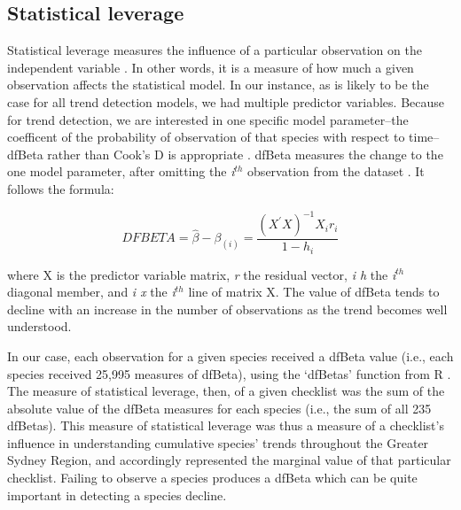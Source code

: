\documentclass[9pt,twocolumn,twoside,lineno]{pnas-new}
\begin{document}
{\subsection*{Statistical leverage} Statistical leverage measures the influence of a particular observation on the independent variable \cite{cook1977detection}. In other words, it is a measure of how much a given observation affects the statistical model. In our instance, as is likely to be the case for all trend detection models, we had multiple predictor variables.  Because for trend detection, we are interested in one specific model parameter--the coefficent of the probability of observation of that species with respect to time--dfBeta rather than Cook's D is appropriate \citep{bollinger1981book}. dfBeta measures the change to the one model parameter, after omitting the \textit{i$^{th}$} observation from the dataset \cite{belsley1980regression, bollinger1981book}. It follows the formula:

\begin{equation}
D F B E T A=\hat{\beta}-\beta_{(i)}=\frac{\left(X^{\prime} X\right)^{-1} X_{i} r_{i}}{1-h_{i}}
\end{equation}

where X is the predictor variable matrix, \textit{r} the residual vector, \textit{i h} the \textit{i$^{th}$} diagonal member, and \textit{i x} the \textit{i$^{th}$} line of matrix X. The value of dfBeta tends to decline with an increase in the number of observations as the trend becomes well understood.

In our case, each observation for a given species received a dfBeta value (i.e., each species received 25,995 measures of dfBeta), using the `dfBetas' function from R \cite{rcoreteam2018r}. The measure of statistical leverage, then, of a given checklist was the sum of the absolute value of the dfBeta measures for each species (i.e., the sum of all 235 dfBetas). This measure of statistical leverage was thus a measure of a checklist's influence in understanding cumulative species' trends throughout the Greater Sydney Region, and accordingly represented the marginal value of that particular checklist. Failing to observe a species produces a dfBeta which can be quite important in detecting a species decline.  

}
\end{document}

